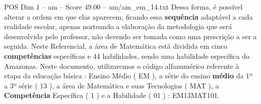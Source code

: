 \begin{textsample}{POS Dim 1 – am – Score 49.00 – am/am\_em\_14.txt}
Dessa forma, é possível alterar a ordem em que elas aparecem, ficando essa \textbf{sequência} adaptável a cada realidade escolar, apenas norteando a elaboração da metodologia que será desenvolvida pelo professor, não devendo ser tomada como uma prescrição a ser a seguida.
Neste Referencial, a área de Matemática está dividida em cinco \textbf{competências} específicas e 44 habilidades, sendo uma habilidade específica do Amazonas.
Neste documento, utilizaremos o código alfanumérico referente à etapa da educação básica : Ensino Médio ( EM ), a série do ensino \textbf{médio} da 1º a 3º série ( 13 ), a área de Matemática e suas Tecnologias ( MAT ), a \textbf{Competência} Específica ( 1 ) e a Habilidade ( 01 ) : EM13MAT101.

\end{textsample}
